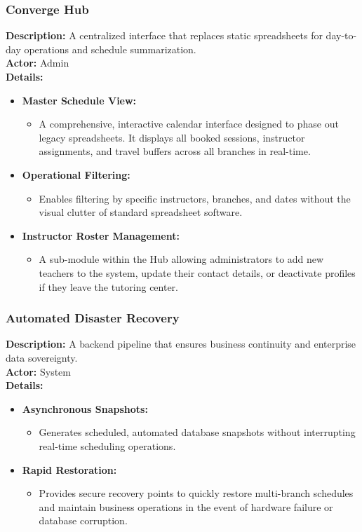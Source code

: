 \subsubsection{Converge Hub}
\textbf{Description:} A centralized interface that replaces static spreadsheets for day-to-day operations and schedule summarization. \\
\textbf{Actor:} Admin \\
\textbf{Details:}
\begin{itemize}
    \item \textbf{Master Schedule View:}
    \begin{itemize}
        \item A comprehensive, interactive calendar interface designed to phase out legacy spreadsheets. It displays all booked sessions, instructor assignments, and travel buffers across all branches in real-time.
    \end{itemize}
    
    \item \textbf{Operational Filtering:}
    \begin{itemize}
        \item Enables filtering by specific instructors, branches, and dates without the visual clutter of standard spreadsheet software.
    \end{itemize}

    \item \textbf{Instructor Roster Management:}
    \begin{itemize}
        \item A sub-module within the Hub allowing administrators to add new teachers to the system, update their contact details, or deactivate profiles if they leave the tutoring center.
    \end{itemize}
\end{itemize}

\subsubsection{Automated Disaster Recovery}
\textbf{Description:} A backend pipeline that ensures business continuity and enterprise data sovereignty. \\
\textbf{Actor:} System \\
\textbf{Details:}
\begin{itemize}
    \item \textbf{Asynchronous Snapshots:}
    \begin{itemize}
        \item Generates scheduled, automated database snapshots without interrupting real-time scheduling operations.
    \end{itemize}
    
    \item \textbf{Rapid Restoration:}
    \begin{itemize}
        \item Provides secure recovery points to quickly restore multi-branch schedules and maintain business operations in the event of hardware failure or database corruption.
    \end{itemize}
\end{itemize}

